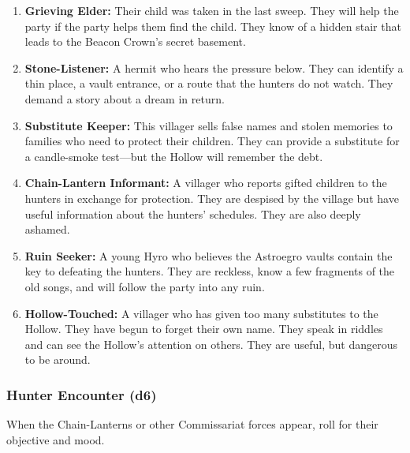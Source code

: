\begin{enumerate}
\item \textbf{Grieving Elder:} Their child was taken in the last sweep. They will help the party if the party helps them find the child. They know of a hidden stair that leads to the Beacon Crown's secret basement.
\item \textbf{Stone-Listener:} A hermit who hears the pressure below. They can identify a thin place, a vault entrance, or a route that the hunters do not watch. They demand a story about a dream in return.
\item \textbf{Substitute Keeper:} This villager sells false names and stolen memories to families who need to protect their children. They can provide a substitute for a candle-smoke test---but the Hollow will remember the debt.
\item \textbf{Chain-Lantern Informant:} A villager who reports gifted children to the hunters in exchange for protection. They are despised by the village but have useful information about the hunters' schedules. They are also deeply ashamed.
\item \textbf{Ruin Seeker:} A young Hyro who believes the Astroegro vaults contain the key to defeating the hunters. They are reckless, know a few fragments of the old songs, and will follow the party into any ruin.
\item \textbf{Hollow-Touched:} A villager who has given too many substitutes to the Hollow. They have begun to forget their own name. They speak in riddles and can see the Hollow's attention on others. They are useful, but dangerous to be around.
\end{enumerate}

\subsubsection*{Hunter Encounter (d6)}
When the Chain-Lanterns or other Commissariat forces appear, roll for their objective and mood.

